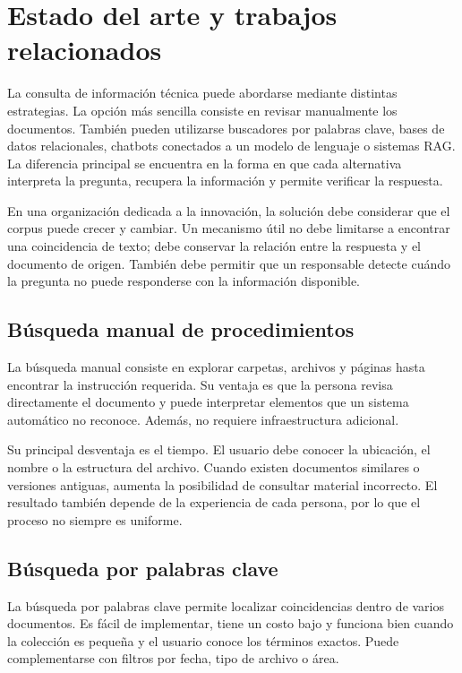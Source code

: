 \section{Estado del arte y trabajos relacionados}

La consulta de información técnica puede abordarse mediante distintas estrategias. La opción más sencilla consiste en revisar manualmente los documentos. También pueden utilizarse buscadores por palabras clave, bases de datos relacionales, chatbots conectados a un modelo de lenguaje o sistemas RAG. La diferencia principal se encuentra en la forma en que cada alternativa interpreta la pregunta, recupera la información y permite verificar la respuesta.

En una organización dedicada a la innovación, la solución debe considerar que el corpus puede crecer y cambiar. Un mecanismo útil no debe limitarse a encontrar una coincidencia de texto; debe conservar la relación entre la respuesta y el documento de origen. También debe permitir que un responsable detecte cuándo la pregunta no puede responderse con la información disponible.

\subsection{Búsqueda manual de procedimientos}

La búsqueda manual consiste en explorar carpetas, archivos y páginas hasta encontrar la instrucción requerida. Su ventaja es que la persona revisa directamente el documento y puede interpretar elementos que un sistema automático no reconoce. Además, no requiere infraestructura adicional.

Su principal desventaja es el tiempo. El usuario debe conocer la ubicación, el nombre o la estructura del archivo. Cuando existen documentos similares o versiones antiguas, aumenta la posibilidad de consultar material incorrecto. El resultado también depende de la experiencia de cada persona, por lo que el proceso no siempre es uniforme.

\subsection{Búsqueda por palabras clave}

La búsqueda por palabras clave permite localizar coincidencias dentro de varios documentos. Es fácil de implementar, tiene un costo bajo y funciona bien cuando la colección es pequeña y el usuario conoce los términos exactos. Puede complementarse con filtros por fecha, tipo de archivo o área.

